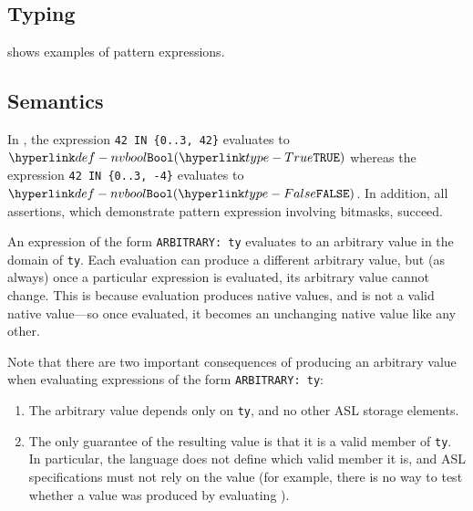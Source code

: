 \begin{mathpar}
\end{mathpar}

\subsection{Typing}
 shows examples of pattern expressions.


\subsection{Semantics}
In ,
the expression \texttt{42 IN \{0..3, 42\}} evaluates to $\nvbool(\True)$
whereas the expression \texttt{42 IN \{0..3, -4\}} evaluates to $\nvbool(\False)$.
%
In addition, all assertions, which demonstrate pattern expression involving bitmasks,
succeed.


\hypertarget{def-arbitraryexpressionterm}{}
An expression of the form \texttt{ARBITRARY: ty} evaluates to an arbitrary value in the
domain of \texttt{ty}.
Each evaluation can produce a different arbitrary value, but (as always) once a particular expression is evaluated, its arbitrary value cannot change.
This is because evaluation produces native values, and \ARBITRARY{} is not a valid native value---so once evaluated, it becomes an unchanging native value like any other.

Note that there are two important consequences of producing an arbitrary value when evaluating expressions of the form \texttt{ARBITRARY: ty}:
\begin{enumerate}
  \item The arbitrary value depends only on \texttt{ty}, and no other ASL storage elements.
  \item The only guarantee of the resulting value is that it is a valid member of \texttt{ty}.
    In particular, the language does not define which valid member it is, and ASL specifications must not rely on the value (for example, there is no way to test whether a value was produced by evaluating \ARBITRARY{}).
\end{enumerate}


